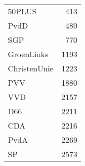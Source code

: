 \begin{tabular}{lr}
\toprule
50PLUS       &   413 \\
PvdD         &   480 \\
SGP          &   770 \\
GroenLinks   &  1193 \\
ChristenUnie &  1223 \\
PVV          &  1880 \\
VVD          &  2157 \\
D66          &  2211 \\
CDA          &  2216 \\
PvdA         &  2269 \\
SP           &  2573 \\
\bottomrule
\end{tabular}
